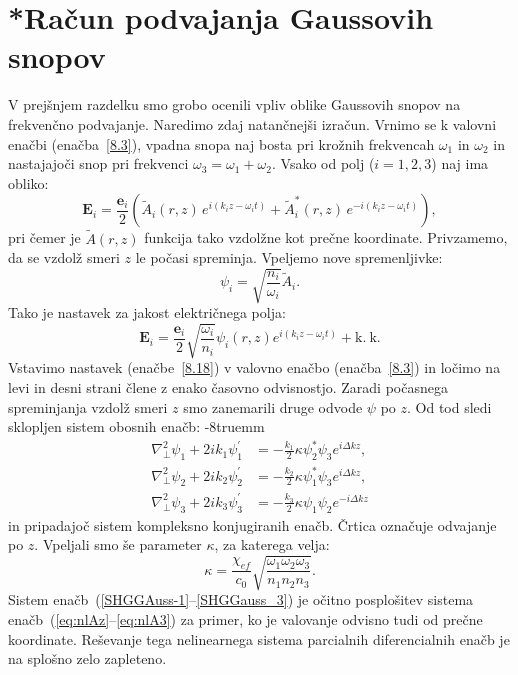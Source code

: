 \section{{*}Račun podvajanja Gaussovih snopov}
V prejšnjem razdelku smo grobo ocenili vpliv oblike Gaussovih snopov
na frekvenčno podvajanje. Naredimo zdaj natančnejši izračun. Vrnimo se k valovni
enačbi (enačba~\ref{8.3}), vpadna snopa naj bosta pri krožnih frekvencah
$\omega_{1}$ in $\omega_{2}$ in nastajajoči snop pri frekvenci
$\omega_{3}=\omega_{1}+\omega_{2}$.
Vsako od polj ($i=1,2,3$) naj ima obliko:
\begin{equation}
\mathbf{E}_{i}  = \frac{\mathbf{e}_{i}}{2}\left(\tilde{A}_{i}(r,z)\, 
e^{i(k_{i}z-\omega_{i}t)}+\tilde{A}_{i}^{*}(r,z)\, e^{-i(k_{i}z-\omega_{i}t)}\right)\!\!,
\end{equation}
pri čemer je $\tilde{A}(r,z)$ funkcija tako vzdolžne kot prečne koordinate. Privzamemo, 
da se vzdolž smeri  $z$ le počasi spreminja.
Vpeljemo nove spremenljivke:
\begin{equation}
\psi_i = \sqrt{\frac{n_i}{\omega_i}}\tilde{A}_i.
\end{equation}
Tako je nastavek za jakost električnega polja:
\begin{equation}
\mathbf{E}_{i}=\frac{\mathbf{e}_{i}}{2}\sqrt{\frac{\omega_{i}}{n_{i}}}\psi_{i}(r,z)
e^{i(k_{i}z-\omega_{i}t)}+\mathrm{k.~k.}
\label{8.18}
\end{equation}
Vstavimo nastavek (enačbe~\ref{8.18}) v valovno
enačbo (enačba~\ref{8.3}) in ločimo na levi in desni strani člene z enako časovno odvisnostjo.
Zaradi počasnega spreminjanja vzdolž smeri $z$ smo zanemarili druge odvode 
$\psi$ po $z$. Od tod sledi sklopljen sistem obosnih enačb:
\vglue-8truemm
\begin{align}
\nabla_{\perp}^{2}\psi_{1}+2ik_{1}\psi_{1}^{\prime} & =  -
\frac{k_{1}}{2}\kappa\psi_{2}^{\ast}\psi_{3}e^{i\Delta kz},\label{SHGGAuss-1}\\
\nabla_{\perp}^{2}\psi_{2}+2ik_{2}\psi_{2}^{\prime} & =  -
\frac{k_{2}}{2}\kappa\psi_{1}^{\ast}\psi_{3}e^{i\Delta kz},\\
\nabla_{\perp}^{2}\psi_{3}+2ik_{3}\psi_{3}^{\prime} & =
 - \frac{k_{3}}{2}\kappa\psi_{1}\psi_{2}e^{-i\Delta kz}
\label{SHGGauss_3}
\end{align}
in pripadajoč sistem kompleksno konjugiranih enačb. 
Črtica označuje odvajanje po $z$. 
Vpeljali smo še parameter $\kappa$, za katerega velja:
\begin{equation}
\kappa=\frac{\chi_{ef}}{c_0} \sqrt{\frac{\omega_{1}\omega_{2}\omega_{3}}{n_{1}n_{2}n_{3}}}.
\label{8.20}
\end{equation}
Sistem enačb~(\ref{SHGGAuss-1}--\ref{SHGGauss_3}) je očitno
posplošitev sistema enačb~(\ref{eq:nlAz}--\ref{eq:nlA3}) za primer, ko je valovanje odvisno
tudi od prečne koordinate. Reševanje tega nelinearnega sistema parcialnih
diferencialnih enačb je na splošno zelo zapleteno.

